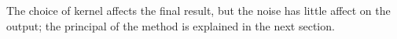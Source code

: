 The choice of kernel affects the final result, but the noise has little affect on the output; the principal of the method is explained in the next section.
